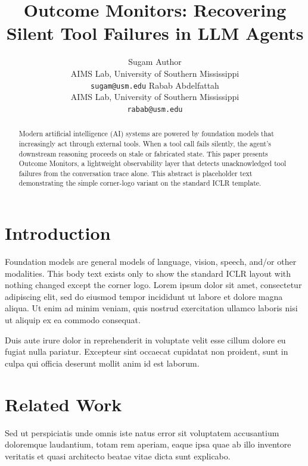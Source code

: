 \documentclass{article}
\title{Outcome Monitors: Recovering Silent Tool Failures in LLM Agents}
\author{Sugam Author \\
AIMS Lab, University of Southern Mississippi \\
\texttt{sugam@usm.edu}
\And
Rabab Abdelfattah \\
AIMS Lab, University of Southern Mississippi \\
\texttt{rabab@usm.edu}}
\begin{document}
\aimscornerlogo
\maketitle
{}

\begin{abstract}
Modern artificial intelligence (AI) systems are powered by foundation models
that increasingly act through external tools. When a tool call fails
silently, the agent's downstream reasoning proceeds on stale or fabricated
state. This paper presents Outcome Monitors, a lightweight observability
layer that detects unacknowledged tool failures from the conversation trace
alone. This abstract is placeholder text demonstrating the simple corner-logo
variant on the standard ICLR template.
\end{abstract}

\section{Introduction}

Foundation models are general models of language, vision, speech, and/or
other modalities. This body text exists only to show the standard ICLR layout
with nothing changed except the corner logo. Lorem ipsum dolor sit amet,
consectetur adipiscing elit, sed do eiusmod tempor incididunt ut labore et
dolore magna aliqua. Ut enim ad minim veniam, quis nostrud exercitation
ullamco laboris nisi ut aliquip ex ea commodo consequat.

Duis aute irure dolor in reprehenderit in voluptate velit esse cillum dolore
eu fugiat nulla pariatur. Excepteur sint occaecat cupidatat non proident,
sunt in culpa qui officia deserunt mollit anim id est laborum.

\section{Related Work}

Sed ut perspiciatis unde omnis iste natus error sit voluptatem accusantium
doloremque laudantium, totam rem aperiam, eaque ipsa quae ab illo inventore
veritatis et quasi architecto beatae vitae dicta sunt explicabo.
\end{document}
